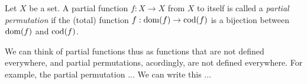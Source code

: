 \begin{defn}
Let $X$ be a set.
A partial function $f: X \rightarrow X$ from $X$ to itself is called a \emph{partial permutation} if the (total) function $f: \operatorname{dom}(f) \rightarrow \operatorname{cod}(f)$ is a bijection between $\operatorname{dom}(f)$ and $\operatorname{cod}(f)$.
\end{defn}

We can think of partial functions thus as functions that are not defined everywhere, and partial permutations, acordingly, are not defined everywhere.
For example, the partial permutation ...
We can write this ...
